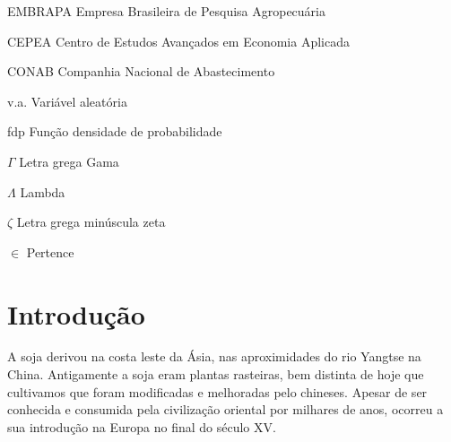 \documentclass[
	12pt,				%
	openright,			%
	oneside,      %
	a4paper,			%
	english,			%
	french,				%
	spanish,			%
	brazil,				%
	]{abntex2}\usepackage[]{graphicx}\usepackage[table]{xcolor}
\theoremstyle{definition}
\theoremstyle{remark}
\begin{document}
\listoffigures*
\cleardoublepage

\listoftables*
\cleardoublepage

\begin{siglas}
  \item [EMBRAPA] Empresa Brasileira de Pesquisa Agropecuária
  \item [CEPEA]   Centro de Estudos Avançados em Economia Aplicada
  \item [CONAB  ] Companhia Nacional de Abastecimento
  \item [v.a.   ] Variável aleatória
  \item [fdp    ] Função densidade de probabilidade
\end{siglas}

\begin{simbolos}
  \item[$ \Gamma $] Letra grega Gama
  \item[$ \Lambda $] Lambda
  \item[$ \zeta $] Letra grega minúscula zeta
  \item[$ \in $] Pertence
  
\end{simbolos}

\tableofcontents*
\cleardoublepage

\textual

\chapter[Introdução]{Introdução}



A soja derivou na costa leste da Ásia, nas aproximidades do rio Yangtse na China. Antigamente a soja eram plantas rasteiras, bem distinta de hoje que cultivamos que foram modificadas e melhoradas pelo chineses. Apesar de ser conhecida e consumida pela civilização oriental por milhares de anos, ocorreu a sua introdução na Europa no final do século XV. 
\end{document}
